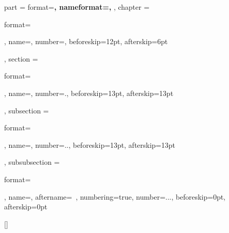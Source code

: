 

\ctexset
{
    part =
    {
        format=\centering{}\bfseries,
        nameformat=\centering\heiti\fontsize{48}{48}\bfseries,
    },
    chapter =
    {
        format=\raggedright{},
        name={},
        number=,
        beforeskip=12pt,
        afterskip=6pt
    },
    section =
    {
        format=\raggedright\heiti {},
        name={},
        number=.,
        beforeskip=13pt,
        afterskip=13pt
    },
    subsection =
    {
        format=\raggedright{},
        name={},
        number=..,
        beforeskip=13pt,
        afterskip=13pt
    },
    subsubsection =
    {
        format=\raggedright{},
        name={},
        aftername=~,
        numbering=true,
        number=...,
        beforeskip=0pt,
        afterskip=0pt
    }
}

\makeatletter
{}
\makeatother

\renewcommand{\contentsname}{ \zihao{2}\heiti 目\ \ 录\vspace{1em}}

[\bibname]{
}
